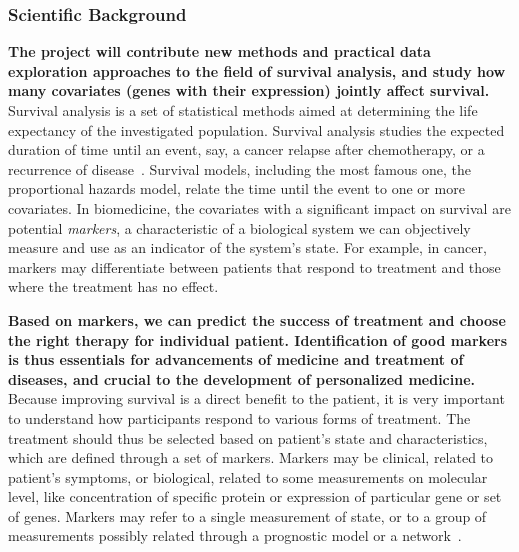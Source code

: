\documentclass[11pt,a4paper]{article}
\renewcommand{\bold}{\textbf}
\begin{document}
\subsubsection*{Scientific Background}

\bold{The project will contribute new methods and practical data exploration approaches to the field of survival analysis, and study how many covariates (genes with their expression) jointly affect survival.} Survival analysis is a set of statistical methods aimed at determining the life expectancy of the investigated population. Survival analysis studies the expected duration of time until an event, say, a cancer relapse after chemotherapy, or a recurrence of disease~\cite{pazdur2008endpoints}. Survival models, including the most famous one, the proportional hazards model, relate the time until the event to one or more covariates. In biomedicine, the covariates with a significant impact on survival are potential {\em markers}, a characteristic of a biological system we can objectively measure and use as an indicator of the system's state. For example, in cancer, markers may differentiate between patients that respond to treatment and those where the treatment has no effect.

\bold{Based on markers, we can predict the success of treatment and choose the right therapy for individual patient. Identification of good markers is thus essentials for advancements of medicine and treatment of diseases, and crucial to the development of personalized medicine.} Because improving survival is a direct benefit to the patient, it is very important to understand how participants respond to various forms of treatment. The treatment should thus be selected based on patient's state and characteristics, which are defined through a set of markers. Markers may be clinical, related to patient's symptoms, or biological, related to some measurements on molecular level, like concentration of specific protein or expression of particular gene or set of genes. Markers may refer to a single measurement of state, or to a group of measurements possibly related through a prognostic model or a network~\cite{Sonawane2019}.
\end{document}
